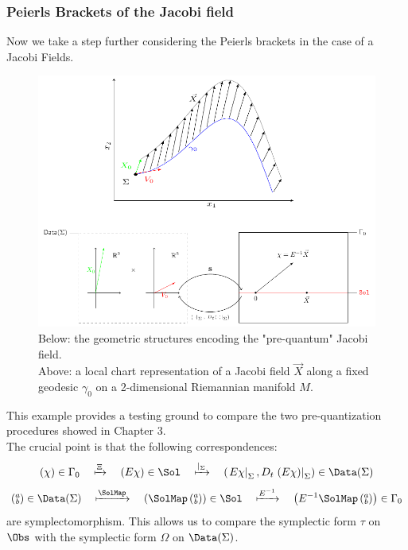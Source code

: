 \documentclass[Main]{subfiles}
\begin{document}
		\subsubsection{Peierls Brackets of the Jacobi field}
		Now we take a step further considering the Peierls brackets in the case of a Jacobi Fields.
		\begin{figure}[h!]
			\includegraphics[width=\textwidth]{Pictures/Jacobi_GeometricPicturePanoramica}	
			\caption{ 
			Below: the geometric structures encoding the "pre-quantum" Jacobi field.
			\\
			Above: a local chart representation of a Jacobi field $\vec{X}$ along a fixed geodesic $\gamma_0$ on a  2-dimensional Riemannian manifold $M$.
			}	
		\end{figure}				

		This example provides a testing ground to compare the two pre-quantization procedures showed in Chapter 3.\\
		The crucial point is that the following correspondences:
		\begin{displaymath}
			(\chi) \in \Gamma_0 \quad \xmapsto{\Xi} \quad (E \chi) \in \Sol \quad \xmapsto{\vert_\Sigma} \quad 
			 \left(\left. E\chi \right\vert_\Sigma , D_t\left.\left( E \chi \right)\right\vert_\Sigma \right) \in\Data(\Sigma)
		\end{displaymath}
		\begin{displaymath}
			 \left(\substack{a\\b}\right) \in\Data(\Sigma) \quad \xmapsto{\SolMap} \quad
			 \left( \SolMap \left(\substack{a\\b}\right) \right)\in \Sol \quad \xmapsto{E^{-1}} \quad 
			 \left( E^{-1}\SolMap \left(\substack{a\\b}\right) \right) \in \Gamma_0
		\end{displaymath}
		are symplectomorphism. This allows us to compare the symplectic form $\tau$ on $\Obs$ with the symplectic form $\Omega$ on $\Data(\Sigma)$.
		
\end{document}
